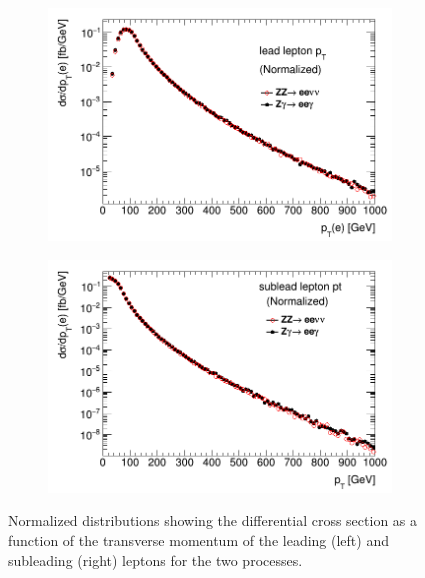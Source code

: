 \documentclass[12pt,a4paper,openright,twoside]{report}
\begin{document}
\begin{figure}[H]
\centering
	\begin{subfigure}{0.49\textwidth}
		\includegraphics[width=\linewidth]{leadpt.png}
		\caption{}
		\label{fig:leadpt}
	\end{subfigure}
	\begin{subfigure}{0.49\textwidth}
		\includegraphics[width=\linewidth]{subleadpt.png}
		\caption{}
		\label{fig:subleadpt}
	\end{subfigure}
	\caption{Normalized distributions showing the differential cross section as a function of the transverse momentum of the leading (left) and subleading (right) leptons for the two processes.}
	\label{fig:leppt}
\end{figure}
\end{document}
